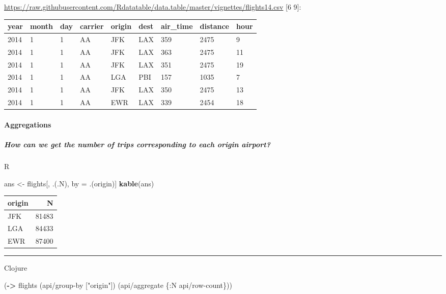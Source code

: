 \documentclass[]{article}
\newenvironment{Shaded}{\begin{snugshade}}{\end{snugshade}}
\newcommand{\AttributeTok}[1]{\textcolor[rgb]{0.77,0.63,0.00}{#1}}
\newcommand{\KeywordTok}[1]{\textcolor[rgb]{0.13,0.29,0.53}{\textbf{#1}}}
\newcommand{\NormalTok}[1]{#1}
\newcommand{\StringTok}[1]{\textcolor[rgb]{0.31,0.60,0.02}{#1}}
\let\oldparagraph\paragraph
\renewcommand{\paragraph}[1]{\oldparagraph{#1}\mbox{}}
\let\oldsubparagraph\subparagraph
\renewcommand{\subparagraph}[1]{\oldsubparagraph{#1}\mbox{}}
\begin{document}
\url{https://raw.githubusercontent.com/Rdatatable/data.table/master/vignettes/flights14.csv}
{[}6 9{]}:

\begin{longtable}[]{@{}lllllllll@{}}
\toprule
year & month & day & carrier & origin & dest & air\_time & distance &
hour\tabularnewline
\midrule
\endhead
2014 & 1 & 1 & AA & JFK & LAX & 359 & 2475 & 9\tabularnewline
2014 & 1 & 1 & AA & JFK & LAX & 363 & 2475 & 11\tabularnewline
2014 & 1 & 1 & AA & JFK & LAX & 351 & 2475 & 19\tabularnewline
2014 & 1 & 1 & AA & LGA & PBI & 157 & 1035 & 7\tabularnewline
2014 & 1 & 1 & AA & JFK & LAX & 350 & 2475 & 13\tabularnewline
2014 & 1 & 1 & AA & EWR & LAX & 339 & 2454 & 18\tabularnewline
\bottomrule
\end{longtable}

\hypertarget{aggregations}{%
\paragraph{Aggregations}\label{aggregations}}

\hypertarget{how-can-we-get-the-number-of-trips-corresponding-to-each-origin-airport}{%
\subparagraph{How can we get the number of trips corresponding to each
origin
airport?}\label{how-can-we-get-the-number-of-trips-corresponding-to-each-origin-airport}}

R

\begin{Shaded}
\begin{Highlighting}[]
\NormalTok{ans <-}\StringTok{ }\NormalTok{flights[, .(.N), by =}\StringTok{ }\NormalTok{.(origin)]}
\KeywordTok{kable}\NormalTok{(ans)}
\end{Highlighting}
\end{Shaded}

\begin{longtable}[]{@{}lr@{}}
\toprule
origin & N\tabularnewline
\midrule
\endhead
JFK & 81483\tabularnewline
LGA & 84433\tabularnewline
EWR & 87400\tabularnewline
\bottomrule
\end{longtable}

\begin{center}\rule{0.5\linewidth}{0.5pt}\end{center}

Clojure

\begin{Shaded}
\begin{Highlighting}[]
\NormalTok{(}\KeywordTok{->}\NormalTok{ flights}
\NormalTok{    (api/group-by [}\StringTok{"origin"}\NormalTok{])}
\NormalTok{    (api/aggregate \{}\AttributeTok{:N}\NormalTok{ api/row-count\}))}
\end{Highlighting}
\end{Shaded}
\end{document}
